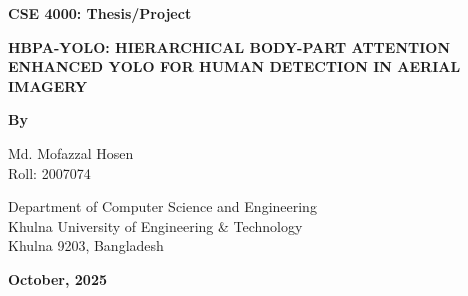 \documentclass[12pt, a4paper]{report}
\begin{document}

\begin{titlepage}
    \centering
    \vspace*{1in}
    
    {\Large\bfseries CSE 4000: Thesis/Project}
    
    \vspace{0.5in}
    
    {\Large\bfseries\MakeUppercase{HBPA-YOLO: Hierarchical Body-Part Attention Enhanced YOLO for Human Detection in Aerial Imagery}}
    
    \vspace{1in}
    
    {\large\bfseries By}
    
    \vspace{0.3in}
    
    {\large Md. Mofazzal Hosen\\
    Roll: 2007074}
    
    \vspace{0.2in}
    
    \vfill
    
    {\large Department of Computer Science and Engineering\\
    Khulna University of Engineering \& Technology\\
    Khulna 9203, Bangladesh}
    
    \vspace{0.3in}
    
    {\large\bfseries October, 2025}
    
\end{titlepage}

\newpage
\end{document}
